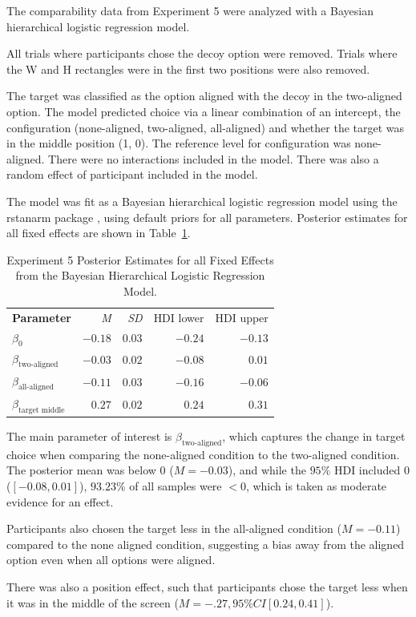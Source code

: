 The comparability data from Experiment 5 were analyzed with a Bayesian hierarchical logistic regression model.

All trials where participants chose the decoy option were removed. Trials where the W and H rectangles were in the first two positions were also removed. 

The target was classified as the option aligned with the decoy in the two-aligned option. The model predicted choice via a linear combination of an intercept, the configuration (none-aligned, two-aligned, all-aligned) and whether the target was in the middle position (1, 0). The reference level for configuration was none-aligned. There were no interactions included in the model. There was also a random effect of participant included in the model. 

The model was fit as a Bayesian hierarchical logistic regression model using the rstanarm package \parencite{rstanarm}, using default priors for all parameters. Posterior estimates for all fixed effects are shown in Table~\ref{tab:e5_logit_params}.

\begin{table}[ht]
    \centering
    \begin{tabular}{lrrrr}
        \toprule
        \textbf{Parameter} & \textit{M} & \textit{SD} & HDI lower & HDI upper \\
        $\beta_{0}$        & $-0.18$    &  $0.03$     & $-0.24$   & $-0.13$   \\
        $\beta_{\text{two-aligned}}$ & $-0.03$ & $0.02$ & $-0.08$ & $0.01$    \\
        $\beta_{\text{all-aligned}}$ & $-0.11$ & $0.03$ & $-0.16$ & $-0.06$   \\
        $\beta_{\text{target middle}}$ & $0.27$ & $0.02$ & $0.24$ & $0.31$    \\
        \bottomrule
    \end{tabular}
    \caption{Experiment 5 Posterior Estimates for all Fixed Effects from the Bayesian Hierarchical Logistic Regression Model.}
    \label{tab:e5_logit_params}
\end{table}

The main parameter of interest is $\beta_{\text{two-aligned}}$, which captures the change in target choice when comparing the none-aligned condition to the two-aligned condition. The posterior mean was below $0$ ($\mathit{M}=-0.03$), and while the $95\%$ HDI included 0 ($[-0.08, 0.01]$), $93.23\%$ of all samples were $<0$, which is taken as moderate evidence for an effect. 

Participants also chosen the target less in the all-aligned condition ($\mathit{M}=-0.11$) compared to the none aligned condition, suggesting a bias away from the aligned option even when all options were aligned. 

There was also a position effect, such that participants chose the target less when it was in the middle of the screen ($\mathit{M}=-.27, 95\%CI[0.24,0.41]$). 